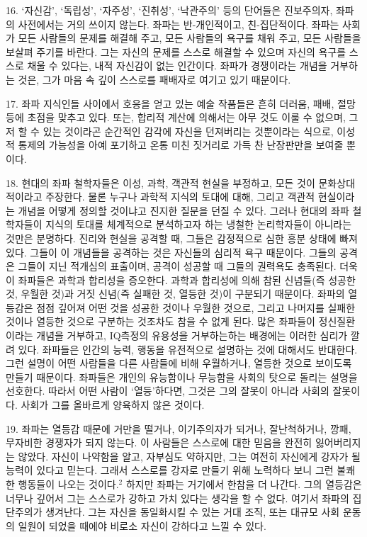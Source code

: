 \documentclass[11pt,a4paper]{article}
\begin{document}
\begin{multicols}{2}
16. `자신감', `독립성', `자주성', `진취성', `낙관주의' 등의 단어들은 진보주의자, 좌파의 사전에서는  거의 쓰이지 않는다. 좌파는 반-개인적이고, 친-집단적이다. 좌파는 사회가 모든 사람들의 문제를 해결해 주고, 모든 사람들의 욕구를 채워 주고, 모든 사람들을 보살펴 주기를 바란다. 그는 자신의 문제를 스스로  해결할 수 있으며 자신의 욕구를 스스로 채울 수 있다는, 내적 자신감이 없는 인간이다. 좌파가  경쟁이라는 개념을 거부하는 것은, 그가 마음 속 깊이 스스로를 패배자로 여기고 있기 때문이다. 


17. 좌파 지식인들 사이에서 호응을 얻고 있는 예술 작품들은 흔히 더러움, 패배, 절망 등에 초점을  맞추고 있다. 또는, 합리적 계산에 의해서는 아무 것도 이룰 수 없으며, 그저 할 수 있는 것이라곤 순간적인 감각에 자신을 던져버리는 것뿐이라는 식으로, 이성적 통제의 가능성을 아예 포기하고 온통  미친 짓거리로 가득 찬 난장판만을 보여줄 뿐이다. 


18. 현대의 좌파 철학자들은 이성, 과학, 객관적 현실을 부정하고, 모든 것이 문화상대적이라고 주장한다. 물론 누구나 과학적 지식의 토대에 대해, 그리고 객관적 현실이라는 개념을 어떻게 정의할 것이냐고  진지한 질문을 던질 수 있다. 그러나 현대의 좌파 철학자들이 지식의 토대를 체계적으로 분석하고자 하는  냉철한 논리학자들이 아니라는 것만은 분명하다. 진리와 현실을 공격할 때, 그들은 감정적으로 심한 흥분  상태에 빠져 있다. 그들이 이 개념들을 공격하는 것은 자신들의 심리적 욕구 때문이다. 그들의 공격은  그들이 지닌 적개심의 표출이며, 공격이 성공할 때 그들의 권력욕도 충족된다. 더욱이 좌파들은 과학과  합리성을 증오한다. 과학과 합리성에 의해 참된 신념들(즉 성공한 것, 우월한 것)과 거짓 신념(즉 실패한  것, 열등한 것)이 구분되기 때문이다. 좌파의 열등감은 점점 깊어져 어떤 것을 성공한 것이나 우월한  것으로, 그리고 나머지를 실패한 것이나 열등한 것으로 구분하는 것조차도 참을 수 없게 된다. 많은  좌파들이 정신질환이라는 개념을 거부하고, IQ측정의 유용성을 거부하는하는 배경에는 이러한 심리가  깔려 있다. 좌파들은 인간의 능력, 행동을 유전적으로 설명하는 것에 대해서도 반대한다. 그런 설명이  어떤 사람들을 다른 사람들에 비해 우월하거나, 열등한 것으로 보이도록 만들기 때문이다. 좌파들은  개인의 유능함이나 무능함을 사회의 탓으로 돌리는 설명을 선호한다. 따라서 어떤 사람이 `열등'하다면,  그것은 그의 잘못이 아니라 사회의 잘못이다. 사회가 그를 올바르게 양육하지 않은 것이다.  


19. 좌파는 열등감 때문에 거만을 떨거나, 이기주의자가 되거나, 잘난척하거나, 깡패, 무자비한 경쟁자가  되지 않는다. 이 사람들은 스스로에 대한 믿음을 완전히 잃어버리지는 않았다. 자신이 나약함을 알고,  자부심도 약하지만, 그는 여전히 자신에게 강자가 될 능력이 있다고 믿는다. 그래서 스스로를 강자로  만들기 위해 노력하다 보니 그런 불쾌한 행동들이 나오는 것이다.\hyperlink{2}{$^{2}$} 하지만 좌파는 거기에서 한참을 더  나간다. 그의 열등감은 너무나 깊어서 그는 스스로가 강하고 가치 있다는 생각을 할 수 없다. 여기서  좌파의 집단주의가 생겨난다. 그는 자신을 동일화시킬 수 있는 거대 조직, 또는 대규모 사회 운동의  일원이 되었을 때에야 비로소 자신이 강하다고 느낄 수 있다.  



\end{multicols}
\end{document}
